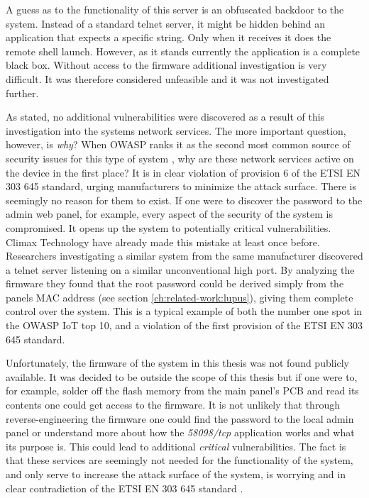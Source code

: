 A guess as to the functionality of this server is an obfuscated backdoor to the system. Instead of a standard telnet server, it might be hidden behind an application that expects a specific string. Only when it receives it does the remote shell launch. However, as it stands currently the application is a complete black box. Without access to the firmware additional investigation is very difficult. It was therefore considered unfeasible and it was not investigated further.

As stated, no additional vulnerabilities were discovered as a result of this investigation into the systems network services. The more important question, however, is \textit{why}? When OWASP ranks it as the second most common source of security issues for this type of system \cite{owasp-iot-top10}, why are these network services active on the device in the first place? It is in clear violation of provision 6 of the ETSI EN 303 645 standard, urging manufacturers to minimize the attack surface. There is seemingly no reason for them to exist. If one were to discover the password to the admin web panel, for example, every aspect of the security of the system is compromised. It opens up the system to potentially critical vulnerabilities. Climax Technology have already made this mistake at least once before. Researchers investigating a similar system from the same manufacturer discovered a telnet server listening on a similar unconventional high port. By analyzing the firmware they found that the root password could be derived simply from the panels MAC address \cite{labvienna} (see section \ref{ch:related-work:lupus}), giving them complete control over the system. This is a typical example of both the number one spot in the OWASP IoT top 10, and a violation of the first provision of the ETSI EN 303 645 standard.

Unfortunately, the firmware of the system in this thesis was not found publicly available. It was decided to be outside the scope of this thesis but if one were to, for example, solder off the flash memory from the main panel's PCB and read its contents one could get access to the firmware. It is not unlikely that through reverse-engineering the firmware one could find the password to the local admin panel or understand more about how the \textit{58098/tcp} application works and what its purpose is. This could lead to additional \textit{critical} vulnerabilities. The fact is that these services are seemingly not needed for the functionality of the system, and only serve to increase the attack surface of the system, is worrying and in clear contradiction of the ETSI EN 303 645 standard \cite{etsi-iot-standard}.
